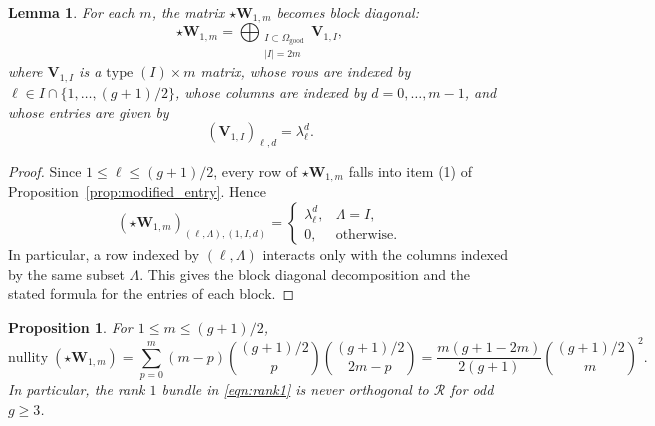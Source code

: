 \documentclass[12pt, letterpaper]{amsart}
\newtheorem{proposition}[theorem]{Proposition}
\newtheorem{lemma}[theorem]{Lemma}
\theoremstyle{definition}
\newcommand{\cR}{\mathcal{R} }
\newcommand{\bV}{\mathbf{V} }
\newcommand{\bW}{\mathbf{W} }
\newcommand{\Om}{\Omega}
\newcommand{\lbd}{\lambda}
\def\type{\mathrm{type}\;}
\def\nullity{\mathrm{nullity}\;}
\begin{document}
\begin{lemma}\label{lem:rank1_block_decomposition}
For each \(m\), the matrix \(\star\bW_{1,m}\) becomes block diagonal:
\[\star\bW_{1,m}=\bigoplus_{\substack{I\subset\Om_{\mathrm{good}}\\|I|=2m}}\bV_{1,I},\]
where \(\bV_{1,I}\) is a \(\type(I)\times m\) matrix, whose rows are indexed by \(\ell\in I\cap\{1,\dots,(g+1)/2\}\), whose columns are indexed by \(d=0,\dots,m-1\), and whose entries are given by
\[(\bV_{1,I})_{\ell,d}=\lbd_\ell^d.\]
\end{lemma}

\begin{proof}
Since \(1\le \ell\le (g+1)/2\), every row of \(\star\bW_{1,m}\) falls into item (1) of Proposition~\ref{prop:modified_entry}. Hence
\[(\star\bW_{1,m})_{(\ell,\Lambda),(1,I,d)}= \begin{cases} \lbd_\ell^d, & \Lambda=I,\\ 0, & \text{otherwise}. \end{cases}\]
In particular, a row indexed by \((\ell,\Lambda)\) interacts only with the columns indexed by the same subset \(\Lambda\). This gives the block diagonal decomposition and the stated formula for the entries of each block.
\end{proof}

\begin{proposition}\label{prop:rank1_nullity}
For \(1\le m\le (g+1)/2\),
\[\nullity(\star\bW_{1,m})=\sum_{p=0}^{m}(m-p)\binom{(g+1)/2}{p}\binom{(g+1)/2}{2m-p}=\frac{m(g+1-2m)}{2(g+1)}\binom{(g+1)/2}{m}^{2}.\]
In particular, the rank \(1\) bundle in \eqref{eqn:rank1} is never orthogonal to \(\cR\) for odd \(g\ge 3\).
\end{proposition}
\end{document}
